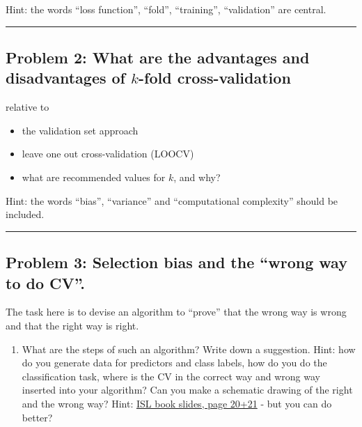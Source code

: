 \documentclass[]{article}
\providecommand{\tightlist}{%
  \setlength{\itemsep}{0pt}\setlength{\parskip}{0pt}}
\begin{document}
Hint: the words ``loss function'', ``fold'', ``training'',
``validation'' are central.

\begin{center}\rule{0.5\linewidth}{\linethickness}\end{center}

\hypertarget{problem-2-what-are-the-advantages-and-disadvantages-of-k-fold-cross-validation}{%
\subsection{\texorpdfstring{Problem 2: What are the advantages and
disadvantages of \(k\)-fold
cross-validation}{Problem 2: What are the advantages and disadvantages of k-fold cross-validation}}\label{problem-2-what-are-the-advantages-and-disadvantages-of-k-fold-cross-validation}}

relative to

\begin{itemize}
\tightlist
\item
  the validation set approach
\item
  leave one out cross-validation (LOOCV)
\item
  what are recommended values for \(k\), and why?
\end{itemize}

Hint: the words ``bias'', ``variance'' and ``computational complexity''
should be included.

\begin{center}\rule{0.5\linewidth}{\linethickness}\end{center}

\hypertarget{problem-3-selection-bias-and-the-wrong-way-to-do-cv.}{%
\subsection{Problem 3: Selection bias and the ``wrong way to do
CV''.}\label{problem-3-selection-bias-and-the-wrong-way-to-do-cv.}}

The task here is to devise an algorithm to ``prove'' that the wrong way
is wrong and that the right way is right.

\begin{enumerate}
\def\labelenumi{\alph{enumi}.}
\tightlist
\item
  What are the steps of such an algorithm? Write down a suggestion.
  Hint: how do you generate data for predictors and class labels, how do
  you do the classification task, where is the CV in the correct way and
  wrong way inserted into your algorithm? Can you make a schematic
  drawing of the right and the wrong way? Hint:
  \href{https://lagunita.stanford.edu/c4x/HumanitiesScience/StatLearning/asset/cv_boot.pdf}{ISL
  book slides, page 20+21} - but you can do better?
\end{enumerate}
\end{document}

